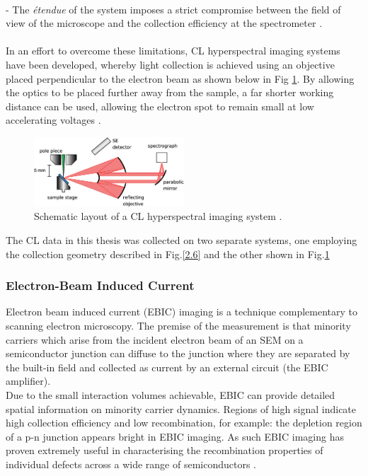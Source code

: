 \\\indent - The {\it\'{e}tendue} of the system imposes a strict compromise between the field of view of the microscope and the collection efficiency at the spectrometer \cite{Edwards2011}.\\
\\\indent In an effort to overcome these limitations, CL hyperspectral imaging systems have been developed, whereby light collection is achieved using an objective placed perpendicular to the electron beam as shown below in Fig \ref{2.7}. By allowing the optics to be placed further away from the sample, a far shorter working distance can be used, allowing the electron spot to remain small at low accelerating voltages \cite{Edwards2011}. 

\begin{figure}[!ht]
	\centering
	\includegraphics[width=0.5\textwidth]{Figs/Ch2/hyper.png}
	\caption[h] {Schematic layout of a CL hyperspectral imaging system \cite{Edwards2012}.}
	\label{2.7}
\end{figure}
\FloatBarrier

The CL data in this thesis was collected on two separate systems, one employing the collection geometry described in Fig.\ref{2.6} and the other shown in Fig.\ref{2.7}
\subsubsection{Electron-Beam Induced Current}

Electron beam induced current  (EBIC) imaging is a technique complementary to scanning electron microscopy. The premise of the measurement is that minority carriers which arise from the incident electron beam of an SEM on a semiconductor junction can diffuse to the junction where they are separated by the built-in field and collected as current by an external circuit (the EBIC amplifier).\\
Due to the small interaction volumes achievable, EBIC can provide detailed spatial information on minority carrier dynamics. Regions of high signal indicate high collection efficiency and low recombination, for example: the depletion region of a p-n junction appears bright in EBIC imaging. As such EBIC imaging has proven extremely useful in characterising the recombination properties of individual defects across a wide range of semiconductors \cite{Yakimov2002}.  


